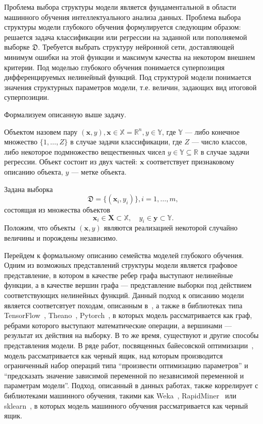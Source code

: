

Проблема  выбора структуры модели является фундаментальной в области машинного обучения интеллектуального анализа данных.
Проблема выбора структуры модели глубокого обучения формулируется следующим образом: решается задача классификации или регрессии на заданной или пополняемой выборке $\mathfrak{D}$. Требуется выбрать структуру нейронной сети, доставляющей минимум ошибки на этой функции и максимум качества на некотором внешнем критерии.
 Под моделью глубокого обучения понимается суперпозиция дифференцируемых нелинейный функций. Под структурой модели понимается значения структурных параметров модели, т.е. величин, задающих вид итоговой суперпозиции. 

Формализуем описанную выше задачу.
\begin{defin}
Объектом назовем пару $(\mathbf{x}, y), \mathbf{x} \in \mathbb{X} =  \mathbb{R}^n, y \in \mathbb{Y}$, где $\mathbb{Y}$ ---  либо конечное множество $\{1, \dots, Z\}$ в случае задачи классификации, где $Z$ --- число классов, либо некоторое подмножество вещественных чисел ${y} \in \mathbb{Y}  \subseteq \mathbb{R}$ в случае задачи регрессии.
Объект состоит из двух частей: $\mathbf{x}$  соответствует признаковому описанию объекта, $y$ --- метке объекта.
\end{defin}

Задана выборка \begin{equation}\label{eq:dataset}\mathfrak{D} = \{(\mathbf{x}_i,y_i)\}, i = 1,\dots,m,\end{equation} состоящая из множества объектов $$\mathbf{x}_i \in \mathbf{X} \subset  \mathbb{X}, \quad {y}_i \in \mathbf{y} \subset \mathbb{Y}.$$ Положим, что объекты $(\mathbf{x}, y)$ являются реализацией некоторой случайно величины и порождены независимо.

Перейдем к формальному описанию семейства моделей глубокого обучения. Одним из возможных представлений структуры модели является графовое представление, в котором в качестве ребер графа выступают нелинейные функции, а в качестве вершин графа --- представление выборки под действием соответствующих нелинейных функций. 
Данный подход к описанию модели является соответсвтует  походам, описанным в~\cite{vokov}, а также в библиотеках типа TensorFlow~\cite{tensorflow}, Theano~\cite{theano}, Pytorch~\cite{pytorch}, в которых модель рассматривается как граф, ребрами которого выступают математические операции, а вершинами --- результат их действия на выборку. 
 В то же время, существуют и другие способы представления модели. В ряде работ, посвященных байесовской оптимизации~\cite{snoek_deep,rbf_surrogate,bo_gp}, модель рассматривается как черный ящик, над которым производится ограниченный набор операций типа ``произвести оптимизацию параметров'' и ``предсказать значение зависимой переменной по независимой переменной и параметрам модели''.
Подход, описанный в данных работах, также коррелирует с  библиотеками машинного обучения, такими как Weka~\cite{weka}, RapidMiner~\cite{rapidminer} или sklearn~\cite{sklearn}, в которых модель машинного обучения рассматривается как черный ящик.

